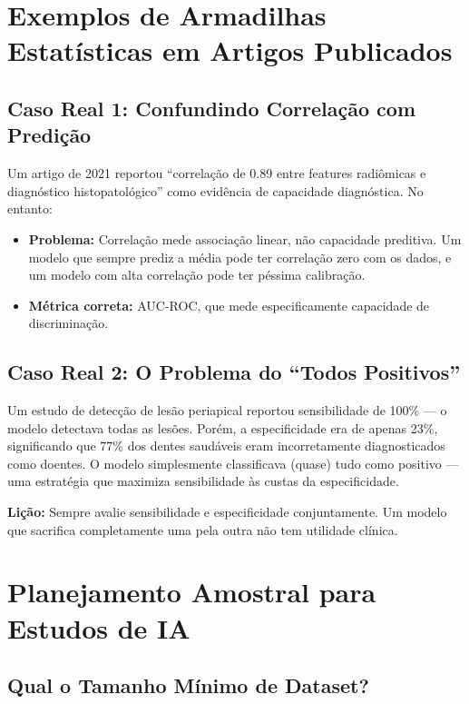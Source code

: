 \section{Exemplos de Armadilhas Estatísticas em Artigos Publicados}

\subsection{Caso Real 1: Confundindo Correlação com Predição}

Um artigo de 2021 reportou ``correlação de 0.89 entre features radiômicas e diagnóstico histopatológico'' como evidência de capacidade diagnóstica. No entanto:

\begin{itemize}
    \item \textbf{Problema:} Correlação mede associação linear, não capacidade preditiva. Um modelo que sempre prediz a média pode ter correlação zero com os dados, e um modelo com alta correlação pode ter péssima calibração.
    \item \textbf{Métrica correta:} AUC-ROC, que mede especificamente capacidade de discriminação.
\end{itemize}

\subsection{Caso Real 2: O Problema do ``Todos Positivos''}

Um estudo de detecção de lesão periapical reportou sensibilidade de 100\% — o modelo detectava todas as lesões. Porém, a especificidade era de apenas 23\%, significando que 77\% dos dentes saudáveis eram incorretamente diagnosticados como doentes. O modelo simplesmente classificava (quase) tudo como positivo — uma estratégia que maximiza sensibilidade às custas da especificidade.

\textbf{Lição:} Sempre avalie sensibilidade e especificidade conjuntamente. Um modelo que sacrifica completamente uma pela outra não tem utilidade clínica.

\section{Planejamento Amostral para Estudos de IA}

\subsection{Qual o Tamanho Mínimo de Dataset?}

